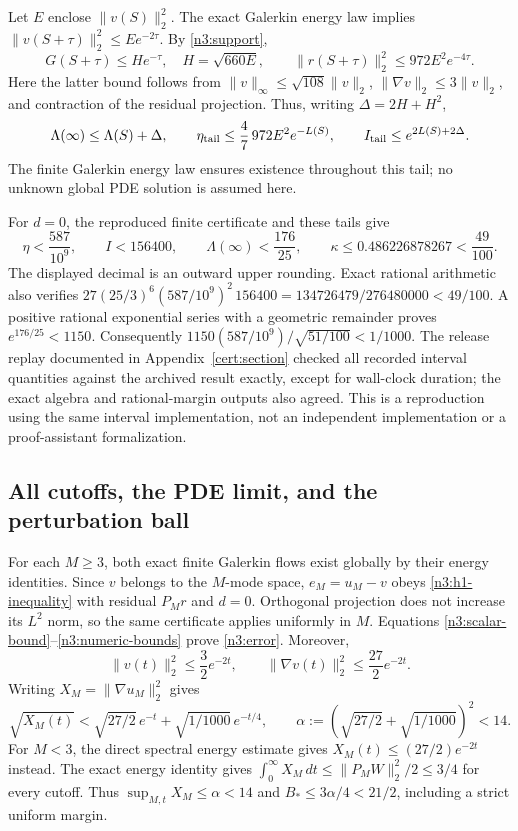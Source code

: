 Let $E$ enclose $\|v(S)\|_2^2$. The exact Galerkin energy law implies
$\|v(S+\tau)\|_2^2\le Ee^{-2\tau}$. By \eqref{n3:support},
\[
 G(S+\tau)\le He^{-\tau},\quad H=\sqrt{660E},\qquad
 \|r(S+\tau)\|_2^2\le972E^2e^{-4\tau}.
\]
Here the latter bound follows from
$\|v\|_\infty\le\sqrt{108}\|v\|_2$,
$\|\nabla v\|_2\le3\|v\|_2$, and contraction of the residual projection.
Thus, writing $\Delta=2H+H^2$,
\begin{equation}
 \Lambda(\infty)\le\Lambda(S)+\Delta,\qquad
 \eta_{\rm tail}\le\frac47\,972E^2e^{-L(S)},\qquad
 I_{\rm tail}\le e^{2L(S)+2\Delta}.
 \label{n3:tails}
\end{equation}
The finite Galerkin energy law ensures existence throughout this tail;
no unknown global PDE solution is assumed here.

For $d=0$, the reproduced finite certificate and these tails give
\begin{equation}
 \eta<\frac{587}{10^9},\qquad I<156400,\qquad
 \Lambda(\infty)<\frac{176}{25},\qquad
 \kappa\le0.486226878267<\frac{49}{100}.
 \label{n3:numeric-bounds}
\end{equation}
The displayed decimal is an outward upper rounding. Exact rational
arithmetic also verifies
$27(25/3)^6(587/10^9)^2\,156400=134726479/276480000<49/100$.
A positive rational exponential series with a geometric remainder proves
$e^{176/25}<1150$. Consequently
$1150(587/10^9)/\sqrt{51/100}<1/1000$.
The release replay documented in Appendix~\ref{cert:section} checked all recorded interval quantities against the
archived result exactly, except for wall-clock duration; the exact algebra
and rational-margin outputs also agreed. This is a reproduction using the
same interval implementation, not an independent implementation or a
proof-assistant formalization.

\subsection{All cutoffs, the PDE limit, and the perturbation ball}
\label{n3:pde}

For each $M\ge3$, both exact finite Galerkin flows exist globally by
their energy identities. Since $v$ belongs to the $M$-mode space,
$e_M=u_M-v$ obeys \eqref{n3:h1-inequality} with residual $P_Mr$ and
$d=0$. Orthogonal projection does not increase its $L^2$ norm, so the same
certificate applies uniformly in $M$. Equations
\eqref{n3:scalar-bound}--\eqref{n3:numeric-bounds} prove
\eqref{n3:error}. Moreover,
\[
 \|v(t)\|_2^2\le\frac32e^{-2t},\qquad
 \|\nabla v(t)\|_2^2\le\frac{27}{2}e^{-2t}.
\]
Writing $X_M=\|\nabla u_M\|_2^2$ gives
\[
 \sqrt{X_M(t)}<\sqrt{27/2}\,e^{-t}+\sqrt{1/1000}\,e^{-t/4},
 \qquad \alpha:=(\sqrt{27/2}+\sqrt{1/1000})^2<14.
\]
For $M<3$, the direct spectral energy estimate gives
$X_M(t)\le(27/2)e^{-2t}$ instead. The exact energy identity gives
$\int_0^\infty X_M\,dt\le\|P_MW\|_2^2/2\le3/4$ for every cutoff.
Thus $\sup_{M,t}X_M\le\alpha<14$ and
$B_*\le3\alpha/4<21/2$, including a strict uniform margin.

